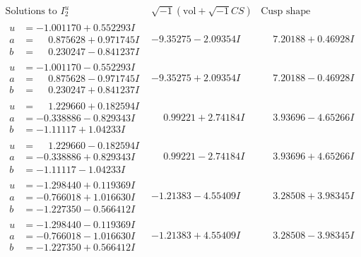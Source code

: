 \documentclass[1p]{elsarticle_modified}
\theoremstyle{definition}
\newcommand{\I}{\sqrt{-1}}
\begin{document}
$$\begin{array}{c|c|c}  
\text{Solutions to }I^u_{2}& \I (\text{vol} + \sqrt{-1}CS) & \text{Cusp shape}\\
 \hline 
\begin{aligned}
u &= -1.001170 + 0.552293 I \\
a &= \phantom{-}0.875628 + 0.971745 I \\
b &= \phantom{-}0.230247 - 0.841237 I\end{aligned}
 & -9.35275 - 2.09354 I & \phantom{-}7.20188 + 0.46928 I \\ \hline\begin{aligned}
u &= -1.001170 - 0.552293 I \\
a &= \phantom{-}0.875628 - 0.971745 I \\
b &= \phantom{-}0.230247 + 0.841237 I\end{aligned}
 & -9.35275 + 2.09354 I & \phantom{-}7.20188 - 0.46928 I \\ \hline\begin{aligned}
u &= \phantom{-}1.229660 + 0.182594 I \\
a &= -0.338886 - 0.829343 I \\
b &= -1.11117 + 1.04233 I\end{aligned}
 & \phantom{-}0.99221 + 2.74184 I & \phantom{-}3.93696 - 4.65266 I \\ \hline\begin{aligned}
u &= \phantom{-}1.229660 - 0.182594 I \\
a &= -0.338886 + 0.829343 I \\
b &= -1.11117 - 1.04233 I\end{aligned}
 & \phantom{-}0.99221 - 2.74184 I & \phantom{-}3.93696 + 4.65266 I \\ \hline\begin{aligned}
u &= -1.298440 + 0.119369 I \\
a &= -0.766018 + 1.016630 I \\
b &= -1.227350 - 0.566412 I\end{aligned}
 & -1.21383 - 4.55409 I & \phantom{-}3.28508 + 3.98345 I \\ \hline\begin{aligned}
u &= -1.298440 - 0.119369 I \\
a &= -0.766018 - 1.016630 I \\
b &= -1.227350 + 0.566412 I\end{aligned}
 & -1.21383 + 4.55409 I & \phantom{-}3.28508 - 3.98345 I \\ \hline\begin{aligned}

\end{aligned}
\end{array}$$
\end{document}
